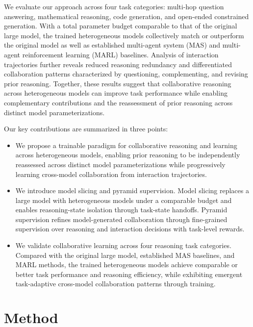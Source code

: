 \documentclass{article} %
\begin{document}
We evaluate our approach across four task categories: multi-hop question answering, mathematical reasoning, code generation, and open-ended constrained generation. With a total parameter budget comparable to that of the original large model, the trained heterogeneous models collectively match or outperform the original model as well as established multi-agent system (MAS) and multi-agent reinforcement learning (MARL) baselines. Analysis of interaction trajectories further reveals reduced reasoning redundancy and differentiated collaboration patterns characterized by questioning, complementing, and revising prior reasoning. Together, these results suggest that collaborative reasoning across heterogeneous models can improve task performance while enabling complementary contributions and the reassessment of prior reasoning across distinct model parameterizations.


Our key contributions are summarized in three points:

\begingroup
\setlength{\leftmargini}{1em}
\begin{itemize}

\item We propose a trainable paradigm for collaborative reasoning and learning across heterogeneous models, enabling prior reasoning to be independently reassessed across distinct model parameterizations while progressively learning cross-model collaboration from interaction trajectories.

\item We introduce model slicing and pyramid supervision. Model slicing replaces a large model with heterogeneous models under a comparable budget and enables reasoning-state isolation through task-state handoffs. Pyramid supervision refines model-generated collaboration through fine-grained supervision over reasoning and interaction decisions with task-level rewards.

\item We validate collaborative learning across four reasoning task categories. Compared with the original large model, established MAS baselines, and MARL methods, the trained heterogeneous models achieve comparable or better task performance and reasoning efficiency, while exhibiting emergent task-adaptive cross-model collaboration patterns through training.

\end{itemize}
\endgroup

\section{Method}
\end{document}
